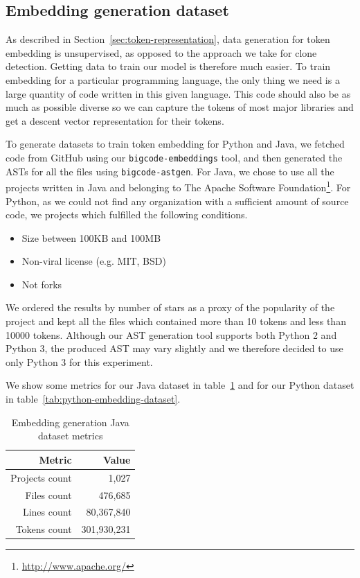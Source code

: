 \subsection{Embedding generation dataset}
As described in Section~\ref{sec:token-representation}, data generation for
token embedding is unsupervised, as opposed to the approach we take for clone
detection. Getting data to train our model is therefore much easier. To train
embedding for a particular programming language, the only thing we need is a
large quantity of code written in this given language. This code should also be
as much as possible diverse so we can capture the tokens of most major libraries
and get a descent vector representation for their tokens.

To generate datasets to train token embedding for Python and Java, we fetched
code from GitHub using our \lstinline{bigcode-embeddings} tool, and then
generated the ASTs for all the files using \lstinline{bigcode-astgen}.
For Java, we chose to use all the projects written in Java and belonging to The
Apache Software Foundation\footnote{\url{http://www.apache.org/}}. For Python,
as we could not find any organization with a sufficient amount of source code,
we projects which fulfilled the following conditions.

\begin{itemize}
\item Size between 100KB and 100MB
\item Non-viral license (e.g. MIT, BSD)
\item Not forks
\end{itemize}

We ordered the results by number of stars as a proxy of the popularity of the
project and kept all the files which contained more than 10 tokens and less than
10000 tokens. Although our AST generation tool supports both Python 2 and Python
3, the produced AST may vary slightly and we therefore decided to use only
Python 3 for this experiment.

We show some metrics for our Java dataset in
table~\ref{tab:java-embedding-dataset} and for our Python dataset in
table~\ref{tab:python-embedding-dataset}.

\begin{table}
  \caption{\label{tab:java-embedding-dataset}Embedding generation Java dataset
    metrics}
  \begin{center}
    \begin{tabular}{r r}
      \toprule
      Metric & Value\\
      \toprule
      Projects count & 1,027\\
      Files count & 476,685\\
      Lines count & 80,367,840\\
      Tokens count & 301,930,231\\
      \bottomrule
    \end{tabular}
  \end{center}
\end{table}

